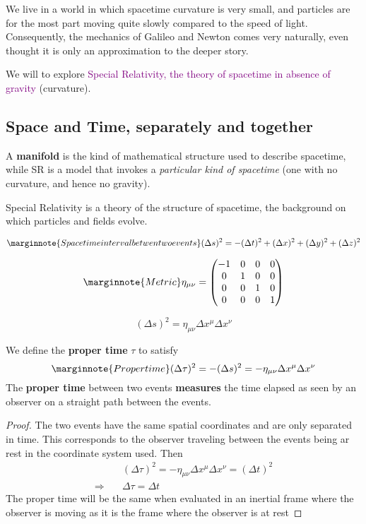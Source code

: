 We live in a world in which spacetime curvature is very small, and particles are for the most part moving quite slowly compared to the speed of light. Consequently, the mechanics of Galileo and Newton comes very naturally, even thought it is only an approximation to the deeper story.

We will to explore \textcolor{purple}{Special Relativity, the theory of spacetime in absence of gravity} (curvature).

\subsection{Space and Time, separately and together}
A \textbf{manifold} is the kind of mathematical structure used to describe spacetime, while SR is a model that invokes a \textit{particular kind of spacetime} (one with no curvature, and hence no gravity).

Special Relativity is a theory of the structure of spacetime, the background on which particles and fields evolve.

\begin{equation}\marginnote{Spacetime interval betwen two events}
    (\Delta s)^2=-(\Delta t)^2+(\Delta x)^2+(\Delta y)^2+(\Delta z)^2
\end{equation}

\begin{equation}\marginnote{Metric}
    \eta_{\mu\nu}=\mqty(\dmat[0]{-1,1,1,1})
\end{equation}

\begin{equation}\label{eq:interval}
    (\Delta s)^2=\eta_{\mu\nu}\Delta x^\mu\Delta x^\nu
\end{equation}

We define the \textbf{proper time} $\tau$ to satisfy
\begin{equation}\marginnote{Proper time}
    (\Delta \tau)^2=-(\Delta s)^2=-\eta_{\mu\nu}\Delta x^\mu\Delta x^\nu
\end{equation}
The \textbf{proper time} between two events \textbf{measures} the time elapsed as seen by an observer on a straight path between the events.

\begin{proof}
    The two events have the same spatial coordinates and are only separated in time. This corresponds to the observer traveling between the events being ar rest in the coordinate system used. Then
    \begin{align}
        &(\Delta\tau)^2=-\eta_{\mu\nu}\Delta x^\mu\Delta x^\nu=(\Delta t)^2 \\ 
        \Rightarrow\quad  &\Delta\tau=\Delta t
    \end{align}
    The proper time will be the same when evaluated in an inertial frame where the observer is moving as it is the frame where the observer is at rest
\end{proof}

